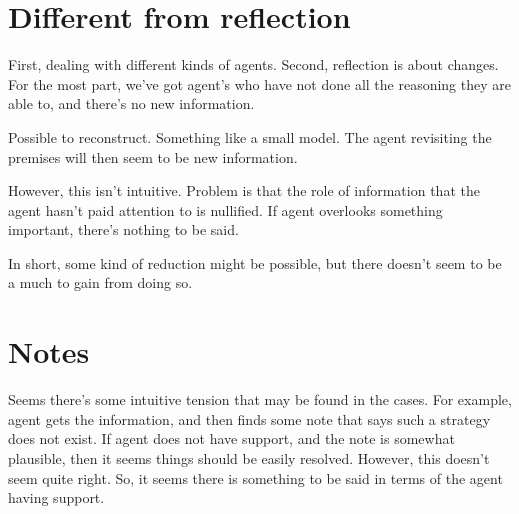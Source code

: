 \section{Different from reflection}
\label{sec:diff-from-refl}

\begin{note}
  First, dealing with different kinds of agents.
  Second, reflection is about changes.
  For the most part, we've got agent's who have not done all the reasoning they are able to, and there's no new information.

  Possible to reconstruct.
  Something like a small model.
  The agent revisiting the premises will then seem to be new information.

  However, this isn't intuitive.
  Problem is that the role of information that the agent hasn't paid attention to is nullified.
  If agent overlooks something important, there's nothing to be said.

  In short, some kind of reduction might be possible, but there doesn't seem to be a much to gain from doing so.
\end{note}


\section{Notes}
\label{sec:notes-1}

\begin{note}[To add]
    Seems there's some intuitive tension that may be found in the cases.
    For example, agent gets the information, and then finds some note that says such a strategy does not exist.
    If agent does not have support, and the note is somewhat plausible, then it seems things should be easily resolved.
    However, this doesn't seem quite right.
    So, it seems there is something to be said in terms of the agent having support.
  \end{note}